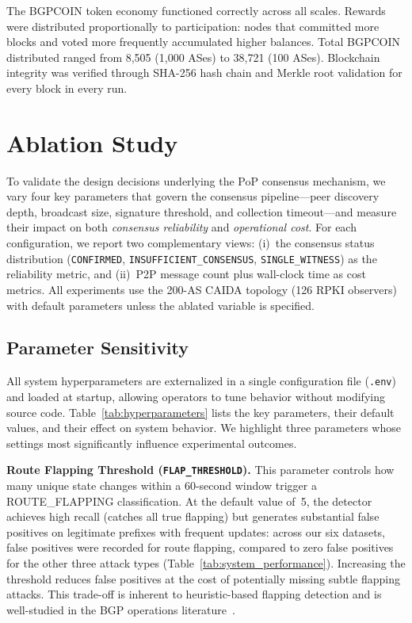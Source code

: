\documentclass[conference]{IEEEtran}
\begin{document}
The BGPCOIN token economy functioned correctly across all scales. Rewards were distributed proportionally to participation: nodes that committed more blocks and voted more frequently accumulated higher balances. Total BGPCOIN distributed ranged from 8,505 (1{,}000 ASes) to 38,721 (100 ASes). Blockchain integrity was verified through SHA-256 hash chain and Merkle root validation for every block in every run.
\fi %


\section{Ablation Study}
\label{sec:ablation}

To validate the design decisions underlying the PoP consensus mechanism, we vary four key parameters that govern the consensus pipeline---peer discovery depth, broadcast size, signature threshold, and collection timeout---and measure their impact on both \emph{consensus reliability} and \emph{operational cost}. For each configuration, we report two complementary views: (i)~the consensus status distribution (\texttt{CONFIRMED}, \texttt{INSUFFICIENT\_CONSENSUS}, \texttt{SINGLE\_WITNESS}) as the reliability metric, and (ii)~P2P message count plus wall-clock time as cost metrics. All experiments use the 200-AS CAIDA topology (126 RPKI observers) with default parameters unless the ablated variable is specified.

\subsection{Parameter Sensitivity}
\label{subsec:parameter_sensitivity}

All system hyperparameters are externalized in a single configuration file (\texttt{.env}) and loaded at startup, allowing operators to tune behavior without modifying source code. Table~\ref{tab:hyperparameters} lists the key parameters, their default values, and their effect on system behavior. We highlight three parameters whose settings most significantly influence experimental outcomes.

\textbf{Route Flapping Threshold (\texttt{FLAP\_THRESHOLD}).} This parameter controls how many unique state changes within a 60-second window trigger a ROUTE\_FLAPPING classification. At the default value of~5, the detector achieves high recall (catches all true flapping) but generates substantial false positives on legitimate prefixes with frequent updates: across our six datasets, false positives were recorded for route flapping, compared to zero false positives for the other three attack types (Table~\ref{tab:system_performance}). Increasing the threshold reduces false positives at the cost of potentially missing subtle flapping attacks. This trade-off is inherent to heuristic-based flapping detection and is well-studied in the BGP operations literature~\cite{rfc2439}.
\end{document}

